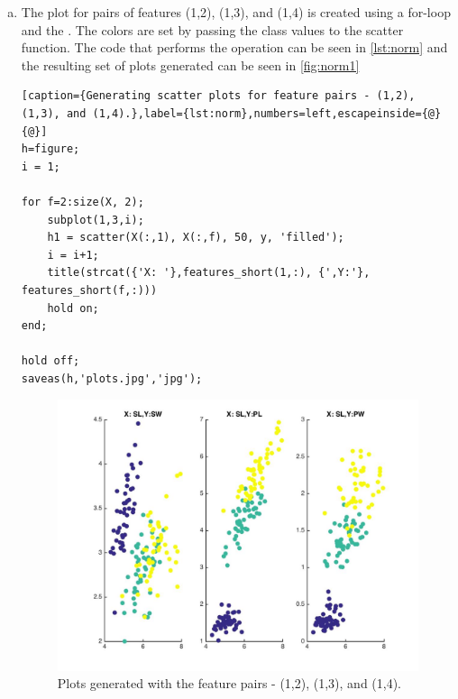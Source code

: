 \documentclass[a4paper, 11pt]{article}
\begin{document}
\begin{enumerate}[(a)]
\item The plot for pairs of features (1,2), (1,3), and (1,4) is created using a for-loop and the . The colors are set by passing the class values to the scatter function. The code that performs the operation can be seen in \autoref{lst:norm} and the resulting set of plots generated can be seen in \autoref{fig:norm1}
\vspace{-20pt}
\begin{lstlisting}[caption={Generating scatter plots for feature pairs - (1,2), (1,3), and (1,4).},label={lst:norm},numbers=left,escapeinside={@}{@}]
h=figure;
i = 1;

for f=2:size(X, 2);
    subplot(1,3,i);
    h1 = scatter(X(:,1), X(:,f), 50, y, 'filled');
    i = i+1;
    title(strcat({'X: '},features_short(1,:), {',Y:'}, features_short(f,:)))
    hold on;    
end;

hold off;
saveas(h,'plots.jpg','jpg');
\end{lstlisting}

\begin{figure}
\centering
\includegraphics[scale=0.25]{plots.jpg}
\caption[norm1]{Plots generated with the feature pairs - (1,2), (1,3), and (1,4).}
\label{fig:norm1}
\end{figure}

\end{enumerate}
\vspace{-10pt}

\end{document}
